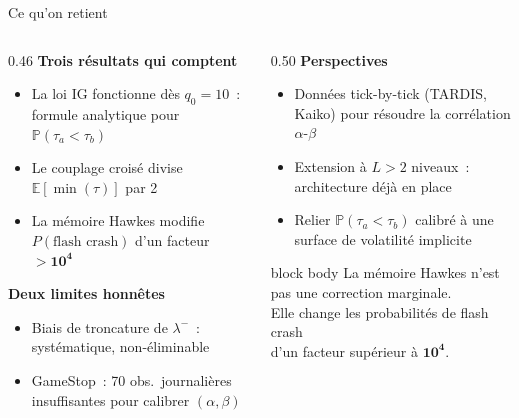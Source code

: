 \documentclass[aspectratio=169,10pt]{beamer}
\newcommand{\E}{\mathbb{E}}
\newcommand{\Pb}{\mathbb{P}}
\begin{document}
\begin{frame}{Ce qu'on retient}
  \begin{columns}[t,onlytextwidth]
    \begin{column}{0.46\textwidth}
      \vspace{4pt}
      \textcolor{bleu303}{\bfseries\small Trois résultats qui comptent}
      \begin{itemize}\itemsep8pt\small
        \item La loi IG fonctionne dès $q_0=10$~:
              formule analytique pour $\Pb(\tau_a<\tau_b)$
        \item Le couplage croisé divise $\E[\min(\tau)]$ par 2
        \item La mémoire Hawkes modifie $P(\text{flash crash})$
              d'un facteur $\mathbf{>10^4}$
      \end{itemize}

      \bigskip
      \textcolor{rouge485}{\bfseries\small Deux limites honnêtes}
      \begin{itemize}\itemsep6pt\small
        \item Biais de troncature de $\lambda^-$~: systématique,
              non-éliminable
        \item GameStop~: 70 obs.\ journalières insuffisantes
              pour calibrer $(\alpha,\beta)$
      \end{itemize}
    \end{column}
    \begin{column}{0.50\textwidth}
      \vspace{4pt}
      \textcolor{vert575}{\bfseries\small Perspectives}
      \begin{itemize}\itemsep6pt\small
        \item Données tick-by-tick (TARDIS, Kaiko)
              pour résoudre la corrélation $\alpha$-$\beta$
        \item Extension à $L>2$ niveaux~: architecture déjà en place
        \item Relier $\Pb(\tau_a<\tau_b)$ calibré
              à une surface de volatilité implicite
      \end{itemize}

      \vfill
      \begin{beamercolorbox}[sep=8pt]{block body}
        \centering\small
        La mémoire Hawkes n'est pas une correction marginale.\\[4pt]
        Elle change les probabilités de flash crash\\
        d'un facteur supérieur à $\mathbf{10^4}$.
      \end{beamercolorbox}
    \end{column}
  \end{columns}
\end{frame}
\end{document}
